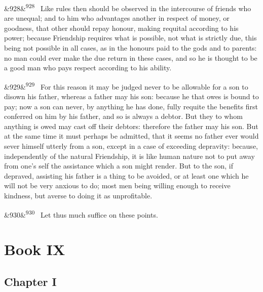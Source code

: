 \documentclass[12pt]{article}
\newcommand{\para}[1][]{\par\noindent\ifx&#1&\else\textsuperscript{\footnotesize #1}~\fi}
\begin{document}
\para[928] Like rules then should be observed in the intercourse of friends who are unequal; and to him who advantages another in respect of money, or goodness, that other should repay honour, making requital according to his power; because Friendship requires what is possible, not what is strictly due, this being not possible in all cases, as in the honours paid to the gods and to parents: no man could ever make the due return in these cases, and so he is thought to be a good man who pays respect according to his ability.

\para[929] For this reason it may be judged never to be allowable for a son to disown his father, whereas a father may his son: because he that owes is bound to pay; now a son can never, by anything he has done, fully requite the benefits first conferred on him by his father, and so is always a debtor. But they to whom anything is owed may cast off their debtors: therefore the father may his son. But at the same time it must perhaps be admitted, that it seems no father ever would sever himself utterly from a son, except in a case of exceeding depravity: because, independently of the natural Friendship, it is like human nature not to put away from one's self the assistance which a son might render. But to the son, if depraved, assisting his father is a thing to be avoided, or at least one which he will not be very anxious to do; most men being willing enough to receive kindness, but averse to doing it as unprofitable.

\para[930] Let thus much suffice on these points.

\section*{Book IX}

\subsection*{Chapter I}
\end{document}
